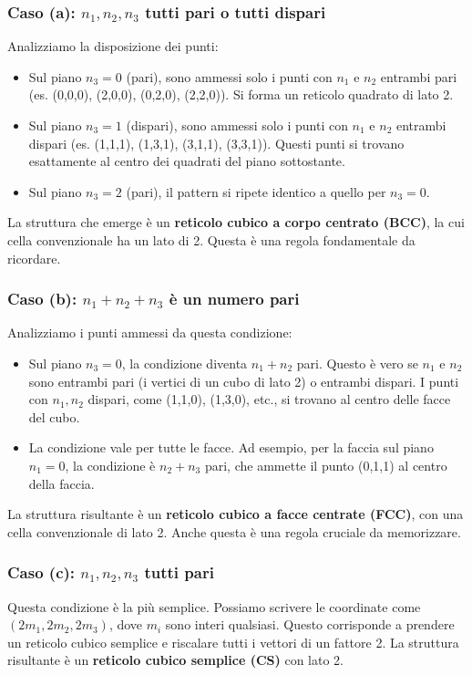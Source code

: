 \subsubsection{Caso (a): $n_1, n_2, n_3$ tutti pari o tutti dispari}
Analizziamo la disposizione dei punti:
\begin{itemize}
    \item Sul piano $n_3=0$ (pari), sono ammessi solo i punti con $n_1$ e $n_2$ entrambi pari (es. (0,0,0), (2,0,0), (0,2,0), (2,2,0)). Si forma un reticolo quadrato di lato 2.
    \item Sul piano $n_3=1$ (dispari), sono ammessi solo i punti con $n_1$ e $n_2$ entrambi dispari (es. (1,1,1), (1,3,1), (3,1,1), (3,3,1)). Questi punti si trovano esattamente al centro dei quadrati del piano sottostante.
    \item Sul piano $n_3=2$ (pari), il pattern si ripete identico a quello per $n_3=0$.
\end{itemize}
La struttura che emerge è un \textbf{reticolo cubico a corpo centrato (BCC)}, la cui cella convenzionale ha un lato di 2. Questa è una regola fondamentale da ricordare.

\subsubsection{Caso (b): $n_1 + n_2 + n_3$ è un numero pari}
Analizziamo i punti ammessi da questa condizione:
\begin{itemize}
    \item Sul piano $n_3=0$, la condizione diventa $n_1+n_2$ pari. Questo è vero se $n_1$ e $n_2$ sono entrambi pari (i vertici di un cubo di lato 2) o entrambi dispari. I punti con $n_1, n_2$ dispari, come (1,1,0), (1,3,0), etc., si trovano al centro delle facce del cubo.
    \item La condizione vale per tutte le facce. Ad esempio, per la faccia sul piano $n_1=0$, la condizione è $n_2+n_3$ pari, che ammette il punto (0,1,1) al centro della faccia.
\end{itemize}
La struttura risultante è un \textbf{reticolo cubico a facce centrate (FCC)}, con una cella convenzionale di lato 2. Anche questa è una regola cruciale da memorizzare.

\subsubsection{Caso (c): $n_1, n_2, n_3$ tutti pari}
Questa condizione è la più semplice. Possiamo scrivere le coordinate come $(2m_1, 2m_2, 2m_3)$, dove $m_i$ sono interi qualsiasi. Questo corrisponde a prendere un reticolo cubico semplice e riscalare tutti i vettori di un fattore 2.
La struttura risultante è un \textbf{reticolo cubico semplice (CS)} con lato 2.

